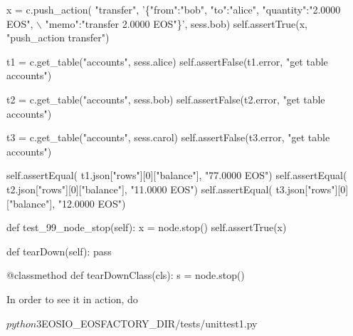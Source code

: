 \begin{DoxyCode}
        x = c.push\_action(
            "transfer", 
            '\{"from":"bob", "to":"alice", "quantity":"2.0000 EOS", \(\backslash\)
                "memo":"transfer 2.0000 EOS"\}', 
            sess.bob)
        self.assertTrue(x, "push\_action transfer")

        t1 =  c.get\_table("accounts", sess.alice)
        self.assertFalse(t1.error, "get table accounts")

        t2 = c.get\_table("accounts", sess.bob)
        self.assertFalse(t2.error, "get table accounts")

        t3 = c.get\_table("accounts", sess.carol)
        self.assertFalse(t3.error, "get table accounts")

        self.assertEqual(
            t1.json["rows"][0]["balance"], "77.0000 EOS")
        self.assertEqual(
            t2.json["rows"][0]["balance"], "11.0000 EOS")
        self.assertEqual(
            t3.json["rows"][0]["balance"], "12.0000 EOS")


    def test\_99\_node\_stop(self):
        x = node.stop()
        self.assertTrue(x)


    def tearDown(self):
        pass

    @classmethod
    def tearDownClass(cls):
        s = node.stop()
\end{DoxyCode}
 In order to see it in action, do 
\begin{DoxyCode}
$ python3 $EOSIO\_EOSFACTORY\_DIR/tests/unittest1.py
\end{DoxyCode}
 